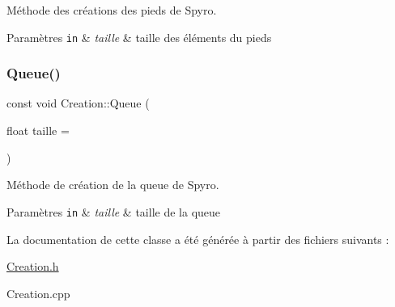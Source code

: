 Méthode des créations des pieds de Spyro. 


\begin{DoxyParams}[1]{Paramètres}
\mbox{\tt in}  & {\em taille} & taille des éléments du pieds \\
\hline
\end{DoxyParams}
\mbox{\label{class_creation_ab24fb518c272fa8f2a54fd57ec57c2c9}} 
\subsubsection{\texorpdfstring{Queue()}{Queue()}}
{\footnotesize\ttfamily const void Creation\+::\+Queue (\begin{DoxyParamCaption}\item[{float}]{taille = {} }\end{DoxyParamCaption})\hspace{0.3cm}{\ttfamily [static]}}



Méthode de création de la queue de Spyro. 


\begin{DoxyParams}[1]{Paramètres}
\mbox{\tt in}  & {\em taille} & taille de la queue \\
\hline
\end{DoxyParams}


La documentation de cette classe a été générée à partir des fichiers suivants \+:\begin{DoxyCompactItemize}
\item 
\hyperlink{_creation_8h}{Creation.\+h}\item 
Creation.\+cpp\end{DoxyCompactItemize}
